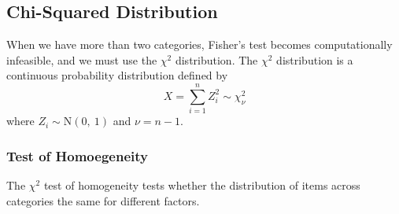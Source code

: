 \documentclass{article}
\begin{document}
\subsection{Chi-Squared Distribution}
When we have more than two categories, Fisher's test becomes computationally infeasible, and we must use
the \(\chi^2\) distribution. The \(\chi^2\) distribution is a continuous probability distribution defined by
\begin{equation*}
    X = \sum_{i = 1}^n Z_i^2 \sim \chi_\nu^2
\end{equation*}
where \(Z_i \sim \mathrm{N}\left( 0,\: 1 \right)\) and \(\nu = n - 1\).
\subsubsection{Test of Homoegeneity}
The \(\chi^2\) test of homogeneity tests whether the distribution
of items across categories the same for different factors.
\end{document}
